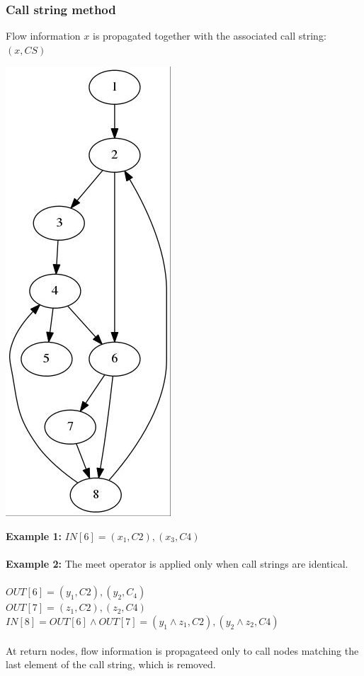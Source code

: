 \documentclass[10pt,a4paper]{article}
\begin{document}
\subsubsection{Call string method}
Flow information $x$ is propagated together with the associated call string: $(x,CS)$
\begin{center}
\includegraphics[scale=0.5]{img/g2.jpg}
\end{center}
\textbf{Example 1:} $IN[6] = (x_1,C2),(x_3,C4)$\\\\
\textbf{Example 2:} The meet operator is applied only when call strings are identical.\\\\
$OUT[6] = (y_1,C2),(y_2,C_4)$\\
$OUT[7] = (z_1,C2),(z_2,C4)$\\
$IN[8] = OUT[6] \wedge OUT[7] = (y_1 \wedge z_1,C2),(y_2 \wedge z_2,C4)$\\\\
At return nodes, flow information is propagateed only to call nodes matching the last element of the call string, which is removed.
\end{document}

